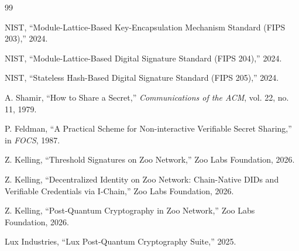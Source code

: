 \begin{thebibliography}{99}

NIST, ``Module-Lattice-Based Key-Encapsulation Mechanism Standard (FIPS 203),'' 2024.

NIST, ``Module-Lattice-Based Digital Signature Standard (FIPS 204),'' 2024.

NIST, ``Stateless Hash-Based Digital Signature Standard (FIPS 205),'' 2024.

A. Shamir, ``How to Share a Secret,'' \textit{Communications of the ACM}, vol. 22, no. 11, 1979.

P. Feldman, ``A Practical Scheme for Non-interactive Verifiable Secret Sharing,'' in \textit{FOCS}, 1987.

Z. Kelling, ``Threshold Signatures on Zoo Network,'' Zoo Labs Foundation, 2026.

Z. Kelling, ``Decentralized Identity on Zoo Network: Chain-Native DIDs and Verifiable Credentials via I-Chain,'' Zoo Labs Foundation, 2026.

Z. Kelling, ``Post-Quantum Cryptography in Zoo Network,'' Zoo Labs Foundation, 2026.

Lux Industries, ``Lux Post-Quantum Cryptography Suite,'' 2025.

\end{thebibliography}

